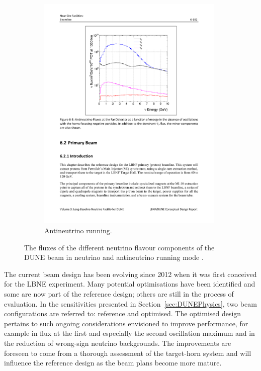 \begin{figure}
\begin{subfigure}[t]{0.48\linewidth}
    \includegraphics[width=0.98\textwidth]{DUNEBeamFluxesAntiNeutrino.pdf}
    \caption{Antineutrino running.}
    \label{fig:DUNEBeamFluxesAntiNeutrino}
  \end{subfigure}
  \caption[The fluxes of the different neutrino flavour components of the DUNE beam in neutrino and antineutrino running mode.]{The fluxes of the different neutrino flavour components of the DUNE beam in neutrino and antineutrino running mode \cite{DUNECDR3}.}
  \label{fig:DUNEBeamFluxes}
\end{figure}

The current beam design has been evolving since 2012 when it was first conceived for the LBNE experiment.  Many potential optimisations have been identified and some are now part of the reference design; others are still in the process of evaluation.  In the sensitivities presented in Section~\ref{sec:DUNEPhysics}, two beam configurations are referred to: reference and optimised.  The optimised design pertains to such ongoing considerations envisioned to improve performance, for example in flux at the first and especially the second oscillation maximum and in the reduction of wrong-sign neutrino backgrounds.  The improvements are foreseen to come from a thorough assessment of the target-horn system and will influence the reference design as the beam plans become more mature.

